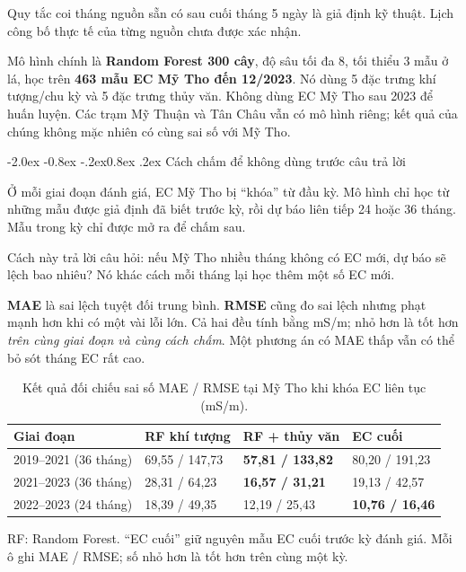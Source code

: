 \documentclass[12pt,a4paper,oneside]{report}
\makeatletter
\renewcommand\section{\@startsection{section}{1}{\z@}%
  {-2.0ex \@plus -0.8ex \@minus -.2ex}{0.8ex \@plus .2ex}%
  {\normalfont\large\bfseries\color{mainteal}}}
\makeatother
\begin{document}
Quy tắc coi tháng nguồn sẵn có sau cuối tháng 5 ngày là giả định kỹ thuật. Lịch công bố thực tế của từng nguồn chưa được xác nhận.

Mô hình chính là \textbf{Random Forest 300 cây}, độ sâu tối đa 8, tối thiểu 3 mẫu ở lá, học trên \textbf{463 mẫu EC Mỹ Tho đến 12/2023}. Nó dùng 5 đặc trưng khí tượng/chu kỳ và 5 đặc trưng thủy văn. Không dùng EC Mỹ Tho sau 2023 để huấn luyện. Các trạm Mỹ Thuận và Tân Châu vẫn có mô hình riêng; kết quả của chúng không mặc nhiên có cùng sai số với Mỹ Tho.

\section{Cách chấm để không dùng trước câu trả lời}

Ở mỗi giai đoạn đánh giá, EC Mỹ Tho bị ``khóa'' từ đầu kỳ. Mô hình chỉ học từ những mẫu được giả định đã biết trước kỳ, rồi dự báo liên tiếp 24 hoặc 36 tháng. Mẫu trong kỳ chỉ được mở ra để chấm sau.

Cách này trả lời câu hỏi: nếu Mỹ Tho nhiều tháng không có EC mới, dự báo sẽ lệch bao nhiêu? Nó khác cách mỗi tháng lại học thêm một số EC mới.

\textbf{MAE} là sai lệch tuyệt đối trung bình. \textbf{RMSE} cũng đo sai lệch nhưng phạt mạnh hơn khi có một vài lỗi lớn. Cả hai đều tính bằng mS/m; nhỏ hơn là tốt hơn \emph{trên cùng giai đoạn và cùng cách chấm}. Một phương án có MAE thấp vẫn có thể bỏ sót tháng EC rất cao.

\begin{table}[htbp]
\centering\small
\caption{Kết quả đối chiếu sai số MAE / RMSE tại Mỹ Tho khi khóa EC liên tục (mS/m).}
\setlength{\tabcolsep}{4pt}
\begin{tabular}{|p{3.3cm}|p{3.0cm}|p{3.4cm}|p{2.9cm}|}
\hline
\textbf{Giai đoạn} & \textbf{RF khí tượng} & \textbf{RF + thủy văn} & \textbf{EC cuối} \\
\hline
2019--2021 (36 tháng) & 69,55 / 147,73 & \textbf{57,81 / 133,82} & 80,20 / 191,23 \\
\hline
2021--2023 (36 tháng) & 28,31 / 64,23 & \textbf{16,57 / 31,21} & 19,13 / 42,57 \\
\hline
2022--2023 (24 tháng) & 18,39 / 49,35 & 12,19 / 25,43 & \textbf{10,76 / 16,46} \\
\hline
\end{tabular}
\par\smallskip
\raggedright\footnotesize RF: Random Forest. ``EC cuối'' giữ nguyên mẫu EC cuối trước kỳ đánh giá. Mỗi ô ghi MAE / RMSE; số nhỏ hơn là tốt hơn trên cùng một kỳ.
\end{table}
\end{document}
